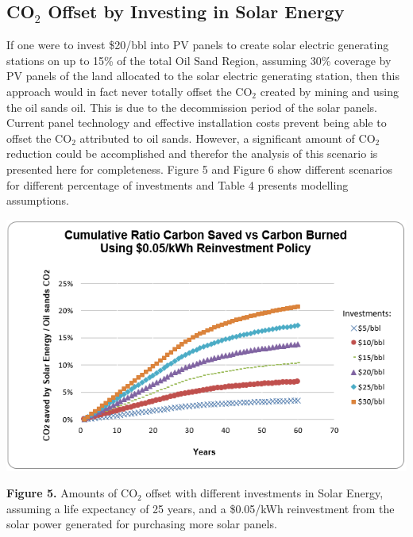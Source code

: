 \documentclass[11pt]{article}
\begin{document}
\subsection{CO$_2$ Offset by Investing in Solar Energy}

If one were to invest \$20/bbl into PV panels to create solar electric generating stations on up to 15\% of the total Oil Sand Region, assuming 30\% coverage by PV panels of the land allocated to the solar electric generating station, then this approach would in fact never totally offset the CO$_2$ created by mining and using the oil sands oil. This is due to the decommission period of the solar panels. Current panel technology and effective installation costs prevent being able to offset the CO$_2$ attributed to oil sands. However, a significant amount of CO$_2$ reduction could be accomplished and therefor the analysis of this scenario is presented here for completeness.  Figure 5 and Figure 6 show different scenarios for different percentage of investments and Table 4 presents modelling assumptions.

\begin{center}
\includegraphics{g5.png}
\end{center}

\begin{center}
{\bf Figure 5.} Amounts of CO$_2$ offset with different investments in Solar Energy, assuming a life expectancy of 25 years, and a \$0.05/kWh reinvestment from the solar power generated for purchasing more solar panels.  
\end{center}
\end{document}
